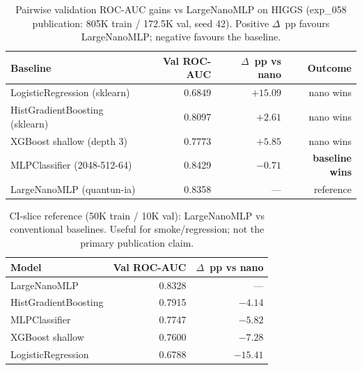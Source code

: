 \begin{table}[ht]
\centering
\caption{Pairwise validation ROC-AUC gains vs LargeNanoMLP on HIGGS
(exp\_058 publication: 805K train / 172.5K val, seed 42).
Positive $\Delta$~pp favours LargeNanoMLP; negative favours the baseline.}
\label{tab:exp_058_gains}
\begin{tabular}{lrrr}
\toprule
Baseline & Val ROC-AUC & $\Delta$~pp vs nano & Outcome \\
\midrule
LogisticRegression (sklearn) & 0.6849 & $+15.09$ & nano wins \\
HistGradientBoosting (sklearn) & 0.8097 & $+2.61$ & nano wins \\
XGBoost shallow (depth 3) & 0.7773 & $+5.85$ & nano wins \\
MLPClassifier (2048-512-64) & 0.8429 & $-0.71$ & \textbf{baseline wins} \\
\midrule
LargeNanoMLP (quantun-ia) & 0.8358 & --- & reference \\
\bottomrule
\end{tabular}
\end{table}

\begin{table}[ht]
\centering
\caption{CI-slice reference (50K train / 10K val): LargeNanoMLP vs conventional baselines.
Useful for smoke/regression; not the primary publication claim.}
\label{tab:exp_058_ci}
\begin{tabular}{lrr}
\toprule
Model & Val ROC-AUC & $\Delta$~pp vs nano \\
\midrule
LargeNanoMLP & 0.8328 & --- \\
HistGradientBoosting & 0.7915 & $-4.14$ \\
MLPClassifier & 0.7747 & $-5.82$ \\
XGBoost shallow & 0.7600 & $-7.28$ \\
LogisticRegression & 0.6788 & $-15.41$ \\
\bottomrule
\end{tabular}
\end{table}
